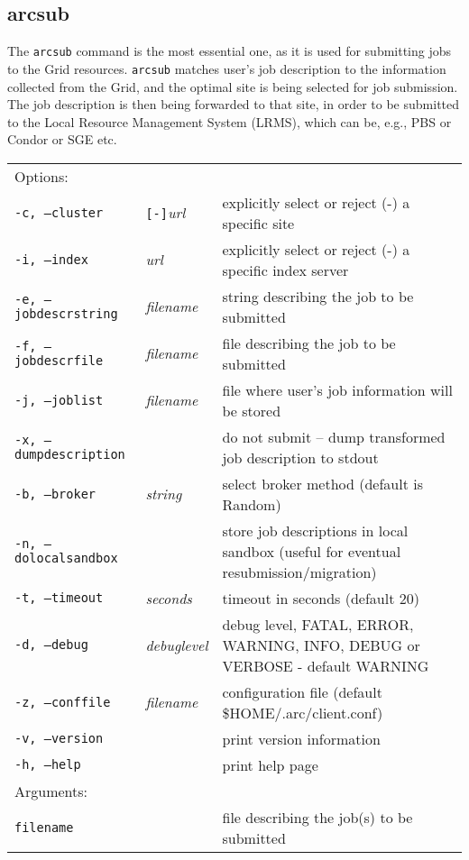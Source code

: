 \subsection{arcsub}\label{sec:arcsub}
The \texttt{arcsub} command is the
most essential one, as it is used for submitting jobs to the Grid
resources. \texttt{arcsub} matches user's job
description to the information collected from the Grid, and the
optimal site is being selected for job submission. The job description
is then being forwarded to that site, in order to be submitted to the
Local Resource Management System (LRMS), which can be, e.g., PBS or
Condor or SGE etc.

\hspace*{0.5cm}
\begin{shaded}
\end{shaded}
\begin{longtable}{llp{8cm}}
   Options:&&\\
   \texttt{-c, --cluster}&\verb#[-]#\textit{url}&explicitly select or reject (-) a specific site\\
   \texttt{-i, --index}&\textit{url}&explicitly select or reject (-) a specific index server\\
   \texttt{-e, --jobdescrstring}&\textit{filename}&string describing the job to be submitted\\
   \texttt{-f, --jobdescrfile}&\textit{filename}&file describing the job to be submitted\\
   \texttt{-j, --joblist}&\textit{filename}&file where user's job information will be stored\\
   \texttt{-x, --dumpdescription}&&do not submit -- dump transformed job description to stdout\\
   \texttt{-b, --broker}&\textit{string}&select broker method (default is Random)\\
   \texttt{-n, --dolocalsandbox}& &store job descriptions in local sandbox (useful for eventual resubmission/migration)\\
   \texttt{-t, --timeout}&\textit{seconds}&timeout in seconds (default 20)\\
   \texttt{-d, --debug}&\textit{debuglevel}&debug level, FATAL, ERROR, WARNING, INFO, DEBUG or VERBOSE - default WARNING\\
   \texttt{-z, --conffile}&\textit{filename}& configuration file (default {\$}HOME/.arc/client.conf)\\
   \texttt{-v, --version}&&print version information\\
   \texttt{-h, --help}&&print help page\\
   Arguments:&&\\
   \texttt{filename}&&file describing the job(s) to be submitted\\
\end{longtable}

